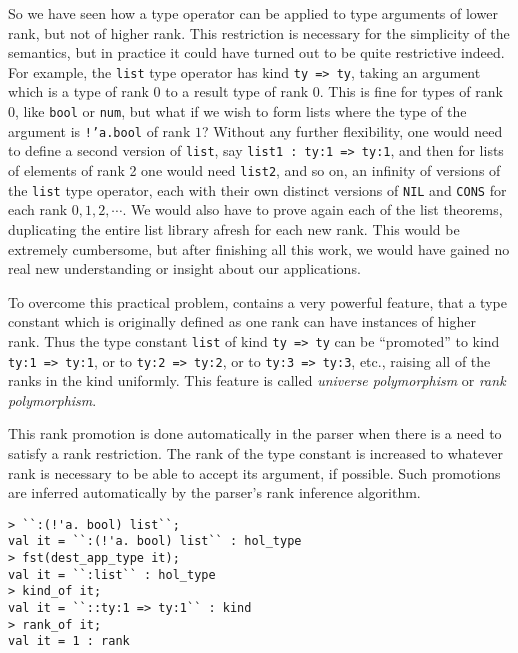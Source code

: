 So we have seen how a type operator can be applied to type arguments
of lower rank, but not of higher rank.
This restriction is necessary for the simplicity of the semantics, but in
practice it could have turned out to be quite restrictive indeed.  For example,
the \texttt{list} type operator has kind \texttt{ty => ty}, taking an
argument which is a type of rank 0 to a result type of rank 0.  This is fine
for types of rank 0, like \texttt{bool} or \texttt{num}, but what if we
wish to form lists where the type of the argument
is
\texttt{!'a.bool}
of rank $1$?
Without any further flexibility, one would need to define
a second version of \texttt{list}, say \texttt{list1\ {:}\ ty:1 => ty:1},
and then for lists of elements of rank 2 one would need
\texttt{list2}, and so on, an infinity of versions
of the \texttt{list} type operator,
each with their own distinct versions of \texttt{NIL} and \texttt{CONS}
for each rank $0, 1, 2, \cdots$.
We would also have to prove again each of the list theorems, duplicating the
entire list library afresh for each new rank.  
This would be extremely cumbersome,
but after finishing all this work, we would have gained 
no real new understanding or insight about our applications.

To overcome this practical problem, \HOLW{} contains
a very powerful feature, that a type constant
which is originally defined as
one rank
can have instances of higher rank.
Thus the type constant \texttt{list} of kind \texttt{ty => ty}
can be ``promoted'' to kind \texttt{ty:1 => ty:1}, or to \texttt{ty:2 => ty:2},
or to \texttt{ty:3 => ty:3}, etc., raising all of the ranks in the kind
uniformly.
This feature is called {\it universe polymorphism\/} or {\it rank polymorphism}.

This rank promotion is done automatically in the parser when there is a need
to satisfy a rank restriction.
The rank of the type constant is increased to whatever rank
is necessary to be able to accept its argument, if possible.
Such promotions are inferred automatically by the parser's rank inference algorithm.
%
\begin{session}
\begin{verbatim}
> ``:(!'a. bool) list``;
val it = ``:(!'a. bool) list`` : hol_type
> fst(dest_app_type it);
val it = ``:list`` : hol_type
> kind_of it;
val it = ``::ty:1 => ty:1`` : kind
> rank_of it;
val it = 1 : rank
\end{verbatim}
\end{session}

